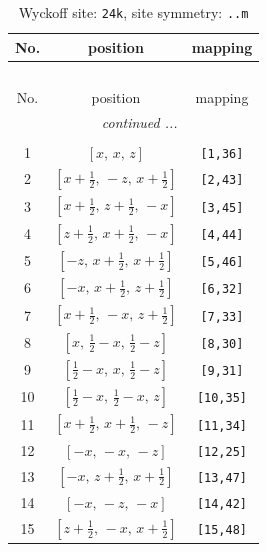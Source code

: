 \documentclass[fleqn,8pt]{jsarticle}
\begin{document}
\begin{longtable}{ccc}
\caption{Wyckoff site: {\tt 24k}, site symmetry: {\tt ..m}}
 \\
 \hline \hline
No. & position & mapping \\ \hline \endfirsthead

\multicolumn{2}{l}{\tablename\ \thetable{}} \\
 \hline \hline
No. & position & mapping \\ \hline \endhead

 \hline \hline
\multicolumn{2}{r}{\footnotesize\it continued ...} \\ \endfoot

 \hline \hline
\multicolumn{2}{r}{} \\ \endlastfoot

1 & $\left[ x,\, x,\, z \right]$ & {\tt [1,36]} \\ \hline
2 & $\left[ x + \frac{1}{2},\, - z,\, x + \frac{1}{2} \right]$ & {\tt [2,43]} \\ \hline
3 & $\left[ x + \frac{1}{2},\, z + \frac{1}{2},\, - x \right]$ & {\tt [3,45]} \\ \hline
4 & $\left[ z + \frac{1}{2},\, x + \frac{1}{2},\, - x \right]$ & {\tt [4,44]} \\ \hline
5 & $\left[ - z,\, x + \frac{1}{2},\, x + \frac{1}{2} \right]$ & {\tt [5,46]} \\ \hline
6 & $\left[ - x,\, x + \frac{1}{2},\, z + \frac{1}{2} \right]$ & {\tt [6,32]} \\ \hline
7 & $\left[ x + \frac{1}{2},\, - x,\, z + \frac{1}{2} \right]$ & {\tt [7,33]} \\ \hline
8 & $\left[ x,\, \frac{1}{2} - x,\, \frac{1}{2} - z \right]$ & {\tt [8,30]} \\ \hline
9 & $\left[ \frac{1}{2} - x,\, x,\, \frac{1}{2} - z \right]$ & {\tt [9,31]} \\ \hline
10 & $\left[ \frac{1}{2} - x,\, \frac{1}{2} - x,\, z \right]$ & {\tt [10,35]} \\ \hline
11 & $\left[ x + \frac{1}{2},\, x + \frac{1}{2},\, - z \right]$ & {\tt [11,34]} \\ \hline
12 & $\left[ - x,\, - x,\, - z \right]$ & {\tt [12,25]} \\ \hline
13 & $\left[ - x,\, z + \frac{1}{2},\, x + \frac{1}{2} \right]$ & {\tt [13,47]} \\ \hline
14 & $\left[ - x,\, - z,\, - x \right]$ & {\tt [14,42]} \\ \hline
15 & $\left[ z + \frac{1}{2},\, - x,\, x + \frac{1}{2} \right]$ & {\tt [15,48]} \\ \hline

\end{longtable}
\end{document}
